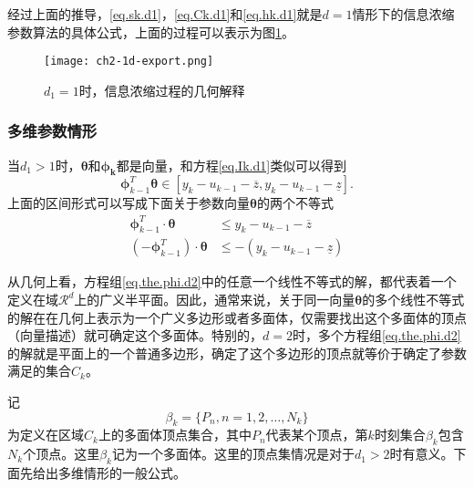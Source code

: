 经过上面的推导，\eqref{eq.sk.d1}，\eqref{eq.Ck.d1}和\eqref{eq.hk.d1}就是$d=1$情形下的信息浓缩参数算法的具体公式，上面的过程可以表示为图\ref{fig.1d.export}。
\begin{figure}
	\centering
	\texttt{[image: ch2-1d-export.png]}\\	 %
	\caption{$d_{1}=1$时，信息浓缩过程的几何解释}
	\label{fig.1d.export}
\end{figure}

\subsubsection{多维参数情形}\label{subsubsect:2.3.3.2}
当$d_{1}>1$时，$\bm{\theta}$和$\bm{\phi_{k}}$都是向量，和方程\eqref{eq.Ik.d1}类似可以得到
\begin{equation}%
\label{eq.the.phi.d2}
\bm{\phi}_{k-1}^{T}\bm{\theta}\in[y_{k}-u_{k-1}-\overline{z},y_{k}-u_{k-1}-\underline{z}].
\end{equation}
上面的区间形式可以写成下面关于参数向量$\bm{\theta}$的两个不等式
\begin{equation}%
\label{eq.the.phi.d2}
\begin{split}%
\bm{\phi}_{k-1}^{T}\cdot\bm{\theta}&\leq y_{k}-u_{k-1}-\overline{z}\\
(-\bm{\phi}_{k-1}^{T})\cdot\bm{\theta}&\leq -(y_{k}-u_{k-1}-\underline{z})
\end{split}
\end{equation}

从几何上看，方程组\eqref{eq.the.phi.d2}中的任意一个线性不等式的解，都代表着一个定义在域$\mathcal{R}^{d}$上的广义半平面。因此，通常来说，关于同一向量$\bm{\theta}$的多个线性不等式的解在在几何上表示为一个广义多边形或者多面体，仅需要找出这个多面体的顶点（向量描述）就可确定这个多面体。特别的，$d=2$时，多个方程组\eqref{eq.the.phi.d2}的解就是平面上的一个普通多边形，确定了这个多边形的顶点就等价于确定了参数满足的集合$C_{k}$。

记
\begin{equation}%
\label{eq.Vk}
\beta_{k}=\{P_{n},n=1,2,\ldots,N_{k}\}
\end{equation}
为定义在区域$C_{k}$上的多面体顶点集合，其中$P_{n}$代表某个顶点，第$k$时刻集合$\beta_{k}$包含$N_{k}$个顶点。这里$\beta_{k}$记为一个多面体。这里的顶点集情况是对于$d_{1}>2$时有意义。下面先给出多维情形的一般公式。

